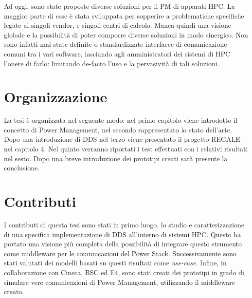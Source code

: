 Ad oggi, sono state proposte diverse soluzioni per il PM di apparati HPC. La maggior parte di esse è stata sviluppata per sopperire a problematiche specifiche legate ai singoli vendor, e singoli centri di calcolo.
Manca quindi una visione globale e la possibilità di poter comporre diverse soluzioni in modo sinergico.
Non sono infatti mai state definite o standardizzate interfacce di comunicazione comuni tra i vari software, lasciando agli amministratori dei sistemi di HPC l'onere di farlo: limitando de-facto l'uso e la pervasività di tali soluzioni.



\section{Organizzazione}
La tesi è organizzata nel seguente modo: nel primo capitolo viene introdotto il concetto di Power Management, nel secondo rappresentato lo stato dell'arte. Dopo una introduzione di DDS nel terzo viene presentato il progetto REGALE nel capitolo 4. Nel quinto verranno riportati i test effettuati con i relativi risultati nel sesto. Dopo una breve introduzione dei prototipi creati sarà presente la conclusione.


\section{Contributi}
I contributi di questa tesi sono stati in primo luogo, lo studio e caratterizzazione di una specifica implementazione di DDS all'interno di sistemi HPC. Questo ha portato una visione più completa della possibilità di integrare questo strumento come middleware per le comunicazioni del Power Stack. Successivamente sono stati valutati dei modelli basati su questi risultati come \emph{use-case}. Infine, in collaborazione con Cineca\cite{Cineca}, BSC\cite{BSC} ed E4\cite{E4}, sono stati creati dei prototipi in grado di simulare vere comunicazioni di Power Management, utilizzando il middleware creato.